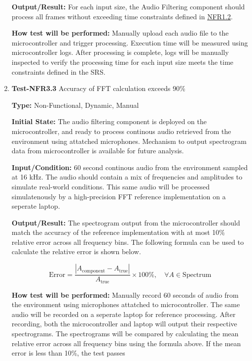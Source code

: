 \documentclass[12pt, titlepage]{article}
\begin{document}
\begin{enumerate}
\textbf{Output/Result:} 
For each input size, the Audio Filtering component should process all frames 
without exceeding time constraints defined in \hyperref[SRS-NFR1_2]{NFR1.2}. 
					
\textbf{How test will be performed:} 
Manually upload each audio file to the microcontroller and trigger processing. 
Execution time will be measured using microcontroller logs. After processing
 is complete, logs will be manually inspected to verify the processing time
 for each input size meets the time constraints defined in the SRS.

\item{\textbf{Test-NFR3.3} Accuracy of FFT calculation exceeds 90\%\\}

\textbf{Type:} Non-Functional, Dynamic, Manual
					
\textbf{Initial State:} 
The audio filtering component is deployed on the microcontroller, and ready to 
process continous audio retrieved from the environment using attatched 
microphones. Mechanism to output spectrogram data from microcontroller is 
available for future analysis.
					
\textbf{Input/Condition:} 
60 second continous audio from the environment sampled at 16 kHz. The audio 
should contain a mix of frequencies and amplitudes to simulate real-world 
conditions. This same audio will be processed simulatenously by a high-precision 
FFT reference implementation on a seperate laptop.
					
\textbf{Output/Result:} 
The spectrogram output from the microcontroller should match the accuracy of 
the reference implementation with at most 10\% relative error across all 
frequency bins. The following formula can be used to calculate the relative 
error is shown below. 

\[
\text{Error} = \frac{\left|A_{\text{component}} - A_{\text{true}}\right|}{A_{\text{true}}} \times 100\%, 
\quad \forall A \in \text{Spectrum}
\]

\textbf{How test will be performed:} 
Manually record 60 seconds of audio from the environment using microphones 
attatched to microcontroller. The same audio will be recorded on a seperate 
laptop for reference processing. After recording, both the microcontroller and 
laptop will output their respective spectrograms. The spectrograms will be
compared by calculating the mean relative error across all frequency bins
using the formula above. If the mean error is less than 10\%, the test passes

\end{enumerate}
\end{document}

